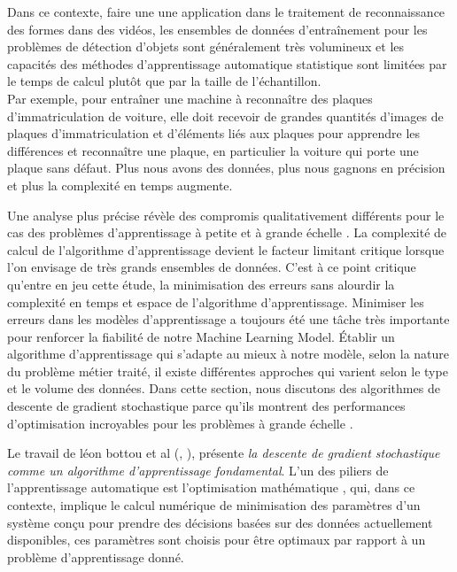 		Dans ce contexte, faire une une application dans le traitement de reconnaissance des formes dans des vidéos, les ensembles de données d'entraînement pour les  problèmes de détection d'objets sont généralement très volumineux et les capacités des méthodes d'apprentissage automatique statistique sont limitées par le temps de calcul plutôt que par la taille de l'échantillon\cite{bottou2010large}.\\
		Par exemple, pour entraîner une machine à reconnaître des plaques d'immatriculation de voiture, elle doit recevoir de grandes quantités d'images de plaques d'immatriculation et d'éléments liés aux plaques pour apprendre les différences et reconnaître une plaque, en particulier la voiture qui porte une plaque sans défaut. Plus nous avons des données, plus nous gagnons en précision et plus la complexité en temps augmente.
		
		Une analyse plus précise révèle des compromis qualitativement différents pour le cas des problèmes d'apprentissage à petite et à grande échelle \cite{bottou2010large}. La complexité de calcul de l'algorithme d'apprentissage devient le facteur limitant critique lorsque l'on envisage de très grands ensembles de données. C'est à ce point critique qu'entre en jeu cette étude, la minimisation des erreurs sans alourdir la complexité en temps et espace de l’algorithme d’apprentissage. Minimiser les erreurs dans les modèles d’apprentissage a toujours été une tâche très importante pour renforcer la fiabilité de notre Machine Learning Model\cite{ibm2018ml}. Établir un algorithme d’apprentissage qui s'adapte au mieux à notre modèle, selon la nature du problème métier traité, il existe différentes approches qui varient selon le type et le volume des données. Dans cette section, nous discutons des algorithmes de descente de gradient stochastique parce qu’ils montrent des performances  d'optimisation incroyables pour les problèmes à grande échelle \cite{bottou2010large}.
		
		Le travail de  léon bottou et al (\eg, \cite{bottou2010large} \cite{wijnhoven2010fast} \cite{bottou2012stochastic} ), présente \textit{la descente de gradient stochastique comme un algorithme d'apprentissage fondamental}.
		L'un des piliers de l'apprentissage automatique est l'optimisation mathématique \cite[Jorge Nocedal dans][page: 3]{bottou2018optimization}, qui, dans ce contexte, implique le calcul numérique de minimisation des paramètres d'un système conçu pour prendre des décisions basées sur des données actuellement disponibles, ces paramètres sont choisis pour être optimaux par rapport à un problème d'apprentissage donné.
		

